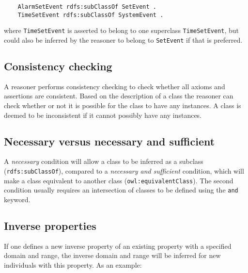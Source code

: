 \begin{verbatim}
	AlarmSetEvent rdfs:subClassOf SetEvent .
	TimeSetEvent rdfs:subClassOf SystemEvent .
\end{verbatim}

where \texttt{TimeSetEvent} is asserted to belong to one superclass \texttt{TimeSetEvent}, but could also be inferred by the reasoner to belong to \texttt{SetEvent} if that is preferred.


\subsection{Consistency checking}

A reasoner performs consistency checking to check whether all axioms and assertions are consistent. Based on the description of a class the reasoner can check whether or not it is possible for the class to have any instances.  A class is deemed to be inconsistent if it cannot possibly have any instances. %

\subsection{Necessary versus necessary and sufficient}

A \emph{necessary} condition will allow a class to be inferred as a subclass (\texttt{rdfs:subClassOf}), compared to a \emph{necessary and sufficient} condition, which will make a class equivalent to another class (\texttt{owl:equivalent\-Class}). The second condition usually requires an intersection of classes to be defined using the \texttt{and} keyword.


\subsection{Inverse properties}

If one defines a new inverse property of an existing property with a specified domain and range, the inverse domain and range will be inferred for new individuals with this property.  As an example:\\

